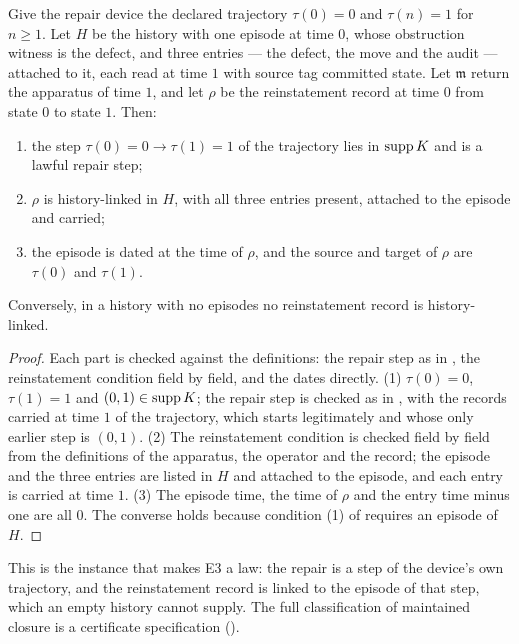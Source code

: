 \begin{theorem}\label{thm:e3-episode}
Give the repair device the declared trajectory $\tau(0) = 0$ and $\tau(n) = 1$ for $n \ge 1$. Let
$H$ be the history with one episode at time $0$, whose obstruction witness is the defect, and three
entries --- the defect, the move and the audit --- attached to it, each read at time $1$ with source
tag committed state. Let $\mathfrak m$ return the apparatus of time $1$, and let $\rho$ be the
reinstatement record at time $0$ from state $0$ to state $1$. Then:
\begin{enumerate}
  \item the step $\tau(0) = 0 \to \tau(1) = 1$ of the trajectory lies in $\operatorname{supp} K$ and is a lawful
    repair step;
  \item $\rho$ is history-linked in $H$, with all three entries present, attached to the episode and
    carried;
  \item the episode is dated at the time of $\rho$, and the source and target of $\rho$ are
    $\tau(0)$ and $\tau(1)$.
\end{enumerate}
Conversely, in a history with no episodes no reinstatement record is history-linked.
\end{theorem}

\begin{proof}
Each part is checked against the definitions: the repair step as in , the reinstatement condition field by field, and the dates directly.
(1) $\tau(0) = 0$, $\tau(1) = 1$ and $(0, 1) \in \operatorname{supp} K$; the repair step is checked as in
, with the records carried at time $1$ of the trajectory, which starts
legitimately and whose only earlier step is $(0, 1)$. (2) The reinstatement condition is checked
field by field from the definitions of the apparatus, the operator and the record; the episode and
the three entries are listed in $H$ and attached to the episode, and each entry is carried at time
$1$. (3) The episode time, the time of $\rho$ and the entry time minus one are all $0$. The converse
holds because condition (1) of  requires an episode of $H$.
\end{proof}


This is the instance that makes E3 a law: the repair is a step of the device's own trajectory, and
the reinstatement record is linked to the episode of that step, which an empty history cannot
supply. The full classification of maintained closure is a certificate specification
().

